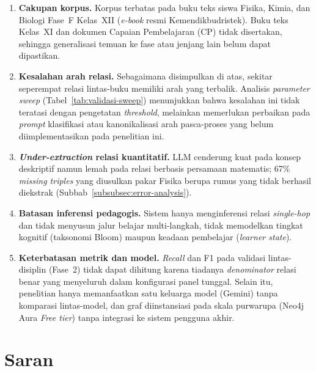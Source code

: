 \documentclass[main]{subfiles}
\begin{document}
\begin{enumerate}
  \item \textbf{Cakupan korpus.} Korpus terbatas pada buku teks siswa Fisika,
        Kimia, dan Biologi Fase~F Kelas~XII (\textit{e-book} resmi
        Kemendikbudristek). Buku teks Kelas~XI dan dokumen Capaian Pembelajaran
        (CP) tidak disertakan, sehingga generalisasi temuan ke fase atau jenjang
        lain belum dapat dipastikan.

  \item \textbf{Kesalahan arah relasi.} Sebagaimana disimpulkan di atas, sekitar
        seperempat relasi lintas-buku memiliki arah yang terbalik. Analisis
        \textit{parameter sweep} (Tabel~\ref{tab:validasi-sweep}) menunjukkan bahwa
        kesalahan ini tidak teratasi dengan pengetatan \textit{threshold},
        melainkan memerlukan perbaikan pada \textit{prompt} klasifikasi atau
        kanonikalisasi arah pasca-proses yang belum diimplementasikan pada
        penelitian ini.

  \item \textbf{\textit{Under-extraction} relasi kuantitatif.} LLM cenderung kuat
        pada konsep deskriptif namun lemah pada relasi berbasis persamaan
        matematis; 67\% \textit{missing triples} yang diusulkan pakar Fisika
        berupa rumus yang tidak berhasil diekstrak
        (Subbab~\ref{subsubsec:error-analysis}).

  \item \textbf{Batasan inferensi pedagogis.} Sistem hanya menginferensi relasi
        \textit{single-hop} dan tidak menyusun jalur belajar multi-langkah, tidak
        memodelkan tingkat kognitif (taksonomi Bloom) maupun keadaan pembelajar
        (\textit{learner state}).

  \item \textbf{Keterbatasan metrik dan model.} \textit{Recall} dan F1 pada
        validasi lintas-disiplin (Fase~2) tidak dapat dihitung karena tiadanya
        \textit{denominator} relasi benar yang menyeluruh dalam konfigurasi panel
        tunggal. Selain itu, penelitian hanya memanfaatkan satu keluarga model
        (Gemini) tanpa komparasi lintas-model, dan graf diinstansiasi pada skala
        purwarupa (Neo4j Aura \textit{Free tier}) tanpa integrasi ke sistem
        pengguna akhir.
\end{enumerate}

\section{Saran}
\end{document}
